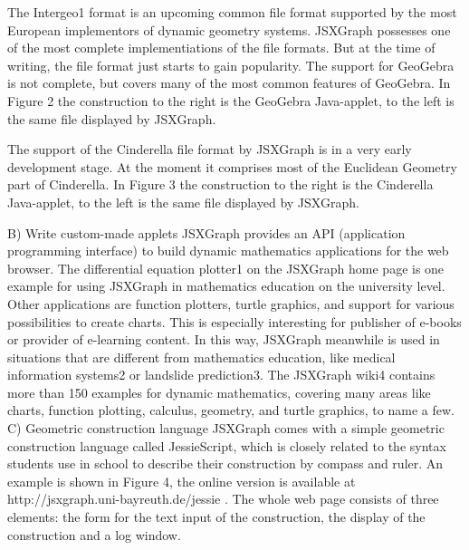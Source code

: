 \documentclass[12pt,a4paper]{article}%
\begin{document}
The Intergeo1 format is an upcoming common file format supported by the most European implementors of dynamic geometry systems. JSXGraph possesses one of the most complete  implementiations of the file formats. But at the time of writing, the file format just starts to gain popularity. 
The support for GeoGebra is not complete, but covers many of the most common features of  GeoGebra. In Figure 2 the construction to the right is the GeoGebra Java-applet, to the left is the same file displayed by JSXGraph.


The support of the Cinderella file format by JSXGraph is in a very early development stage. At the moment it comprises most of the Euclidean Geometry part of Cinderella. In Figure 3 the construction to the right is the Cinderella Java-applet, to the left is the same file displayed by JSXGraph.

B) Write custom-made applets
JSXGraph provides an API (application programming interface) to build dynamic mathematics applications for the web browser. The differential equation plotter1 on the JSXGraph home page is one example for using JSXGraph in mathematics education on the university level. Other applications are function plotters, turtle graphics, and support for various possibilities to create charts. This is especially interesting for publisher of e-books or provider of e-learning content. In this way, JSXGraph meanwhile is used in situations that are different from mathematics education, like medical information systems2 or landslide prediction3. 
The JSXGraph wiki4 contains more than 150 examples for dynamic mathematics, covering many areas like charts, function plotting, calculus, geometry, and turtle graphics, to name a few.
C) Geometric construction language
JSXGraph comes with a simple geometric construction language called JessieScript, which is closely related to the syntax students use in school to describe their construction by compass and ruler. An example is shown in Figure 4, the online version is available at http://jsxgraph.uni-bayreuth.de/jessie . The whole web page consists of three elements: the form for the text input of the construction, the display of the construction and a log window. 
\end{document}
